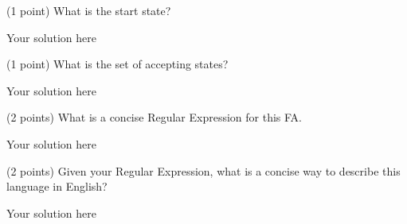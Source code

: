 \documentclass[12pt]{article}
\newenvironment{question}[2][Question]{\begin{trivlist}
\item[\hskip \labelsep {\bfseries #1}\hskip \labelsep {\bfseries #2.}]}{\end{trivlist}}
\newenvironment{solution}[1][Solution:]{\begin{trivlist}
\item[\hskip \labelsep {\bfseries #1}\hskip \labelsep {\bfseries}]\color{blue}}{\end{trivlist}}
\begin{document}
\begin{question}{5}
\begin{enumerate}[(a)]

    \item (1 point) What is the start state?
        \begin{solution}
           \;

            Your solution here
        \end{solution}

	\item (1 point) What is the set of accepting states?
        \begin{solution}
           \;

            Your solution here
        \end{solution}

	\item (2 points) What is a concise Regular Expression for this FA.
        \begin{solution}
        \;

            Your solution here
        \end{solution}

	\item (2 points) Given your Regular Expression, what is a concise way to describe this language in English?
        \begin{solution}
            \;

            Your solution here
        \end{solution}

\end{enumerate}
\end{question}
\end{document}
